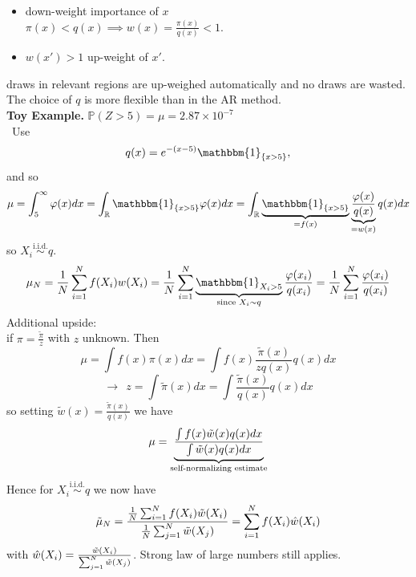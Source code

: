 \documentclass{article}
\begin{document}
\begin{itemize}
    \item down-weight importance of $x$\\
    $\pi (x) < q(x) \implies w(x) = \frac{\pi (x)}{q(x)}< 1$. 
    \item $w(x')>1$ up-weight of $x'$.
\end{itemize}
draws in relevant regions are up-weighed automatically and no draws are wasted. The choice of $q$ is more flexible than in the AR method.\\ 
\textbf{Toy Example.} $\mathbb{P}(Z>5) = \mu= 2.87 \times 10 ^{-7}$\\\
Use 
\begin{equation*}
    q(x)= e ^{-(x-5)} \mathbbm{1}_{\{x>5\}},
\end{equation*}
and so 
\begin{equation*}
    \mu = \int_5^{\infty} \varphi(x) dx= \int_{\mathbb{R}} \mathbbm{1}_{\{x>5\}} \varphi(x) dx = \int_{\mathbb{R}} \underbrace{\mathbbm{1}_{\{x>5\}}}_{= f(x)} \underbrace{\frac{\varphi(x)}{q(x)}}_{=w(x)} q(x) dx
\end{equation*}
so $X_i \stackrel{\text{i.i.d.}}{\sim} q $.
\begin{equation*}
    \mu_N= \frac{1}{N} \sum_{i=1}^N f(X_i)w(X_i) = \frac{1}{N} \sum_{i=1}^N \underbrace{\mathbbm{1}_{X_i>5} }_{\text{since } X_i \sim q }\frac{\varphi(x_i)}{q(x_i)}  = \frac{1}{N} \sum_{i=1}^N\frac{\varphi(x_i)}{q(x_i)} 
\end{equation*}
Additional upside:\\
if $\pi= \frac{\tilde{\pi}}{z}$ with $z$ unknown. Then
\begin{equation*}
    \mu = \int f(x) \pi (x) dx = \int f(x)\frac{\tilde{\pi}(x)}{z q(x)} q(x) dx 
\end{equation*}
\begin{equation*}
    \rightarrow \ \ z= \int \tilde{\pi}(x) dx = \int \frac{\tilde{\pi}(x)}{q(x)}q(x) dx 
\end{equation*}
so setting $\tilde{w}(x)=\frac{\tilde{\pi}(x)}{q(x)}$ we have 
\begin{equation*}
     \mu = \underbrace{\frac{\int f(x) \Tilde{w}(x) q(x) dx }{\int \Tilde{w}(x) q(x) dx}}_{\text{self-normalizing estimate}}
\end{equation*}
Hence for $X_i \stackrel{\text{i.i.d.}}{\sim} q $ we now have 
\begin{equation*}
    \Tilde{\mu}_N = \frac{\frac{1}{N} \sum_{i=1}^N f(X_i)\Tilde{w}(X_i)}{\frac{1}{N} \sum_{j=1}^N \Tilde{w}(X_j)} = \sum_{i=1}^N  f(X_i) \hat{w}(X_i)
\end{equation*}
with $\hat{w}(X_i)= \frac{\Tilde{w}(X_i)}{\sum_{j=1}^N \Tilde{w}(X_j)}$. Strong law of large numbers still applies. \\
\end{document}
